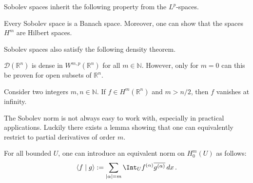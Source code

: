 
    Sobolev spaces inherit the following property from the $L^p$-spaces.
    \begin{property}[Completeness]
        Every Sobolev space is a Banach space. Moreover, one can show that the spaces $H^m$ are Hilbert spaces.
    \end{property}
    Sobolev spaces also satisfy the following density theorem.
    \begin{property}
        $\mathcal{D}(\mathbb{R}^n)$ is dense in $W^{m,p}(\mathbb{R}^n)$ for all $m\in\mathbb{N}$. However, only for $m=0$ can this be proven for open subsets of $\mathbb{R}^n$.
    \end{property}

    \begin{property}
        Consider two integers $m,n\in\mathbb{N}$. If $f\in H^m(\mathbb{R}^n)$ and $m>n/2$, then $f$ vanishes at infinity.
    \end{property}

    The Sobolev norm is not always easy to work with, especially in practical applications. Luckily there exists a lemma showing that one can equivalently restrict to partial derivatives of order $m$.
    \begin{theorem}[Friedrich]
        For all bounded $U$, one can introduce an equivalent norm on $H^m_0(U)$ as follows:
        \begin{gather}
            \langle f\mid g \rangle := \sum_{|\alpha|=m}\Int_U f^{(\alpha)}\overline{g^{(\alpha)}}\,dx\,.
        \end{gather}
    \end{theorem}

